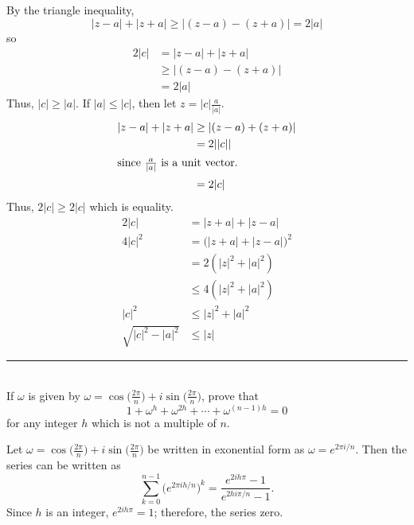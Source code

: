 \documentclass[notitlepage]{report}
\begin{document}
	  
	  By the triangle inequality,
	  \[
	  \lvert z - a\rvert + \lvert z + a\rvert\geq
	  \lvert (z - a) - (z + a)\rvert = 2\lvert a\rvert
	  \]
	  so
	  \begin{align*}
	  2\lvert c\rvert & = \lvert z - a\rvert + \lvert z + a\rvert\\
	  & \geq \lvert (z - a) - (z + a)\rvert\\
	  & = 2\lvert a\rvert
	  \end{align*}
	  Thus, \(\lvert c\rvert\geq\lvert a\rvert\).
	  If \(\lvert a\rvert\leq\lvert c\rvert\), then let
	  \(z = \lvert c\rvert\frac{a}{\lvert a\rvert}\).
	  \begin{align*}
	  \lvert z - a\rvert + \lvert z + a\rvert
	  & \geq \lvert (z - a) + (z + a)\rvert\\
	  & = 2\lvert\lvert c\rvert\rvert\\
	  \intertext{since \(\frac{a}{\lvert a\rvert}\) is a unit vector.}
	  & = 2\lvert c\rvert
	  \end{align*}
	  Thus, \(2\lvert c\rvert\geq 2\lvert c\rvert\) which is equality.
	  \begin{align*}
	  2\lvert c\rvert & = \lvert z + a\rvert + \lvert z - a\rvert\\
	  4\lvert c\rvert^2 & =
	  \bigl(\lvert z + a\rvert + \lvert z - a\rvert\bigr)^2\\
	  & = 2(\lvert z\rvert^2 + \lvert a\rvert^2)\\
	  & \leq 4(\lvert z\rvert^2 + \lvert a\rvert^2)\\
	  \lvert c\rvert^2 & \leq \lvert z\rvert^2 + \lvert a\rvert^2\\
	  \sqrt{\lvert c\rvert^2 - \lvert a\rvert^2} & \leq \lvert z\rvert
	  \end{align*}
	
	 \noindent\rule{\textwidth}{1pt}\\[-0.1cm]
	   If \(\omega\) is given by \(\omega = \cos\bigl(\frac{2\pi}{n}\bigr) +
	   i\sin\bigl(\frac{2\pi}{n}\bigr)\), prove that
	   \[
	   1 + \omega^h + \omega^{2h} + \cdots + \omega^{(n - 1)h} = 0
	   \]
	   for any integer \(h\) which is not a multiple of \(n\).
	   \par\smallskip
	   Let \(\omega = \cos\bigl(\frac{2\pi}{n}\bigr) +
	   i\sin\bigl(\frac{2\pi}{n}\bigr)\) be written in exonential form as
	   \(\omega = e^{2\pi i/n}\).
	   Then the series can be written as
	   \[
	   \sum_{k = 0}^{n - 1}\bigl(e^{2\pi ih/n}\bigr)^k =
	   \frac{e^{2ih\pi} - 1}{e^{2hi\pi/n} - 1}.
	   \]
	   Since \(h\) is an integer, \(e^{2ih\pi} = 1\); therefore, the series zero.
	 
\end{document}
